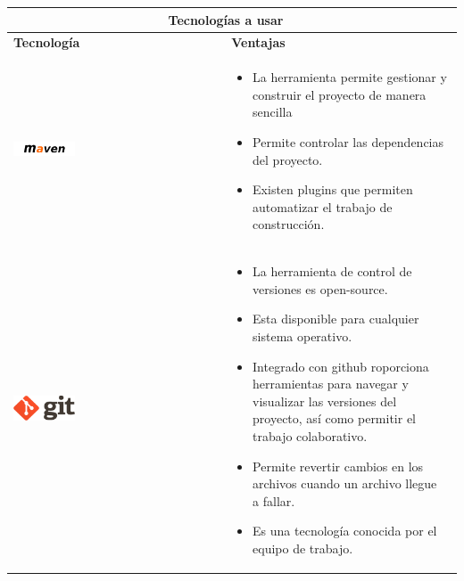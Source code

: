\newpage
\begin{table}[b!]
	\centering
	\vspace{33mm}
	\begin{tabular}{|p{2cm}|ll}
		\hline
		\multicolumn{2}{|c|}{{\bf Tecnologías a usar}} \\ 
		\hline
		\multicolumn{1}{|p{4cm}|}{{\bf Tecnología}}                                   &   
		\multicolumn{1}{p{10cm}|}{{\bf Ventajas}}\\
		\hline
		\multicolumn{1}{|p{5cm}|}{\includegraphics[width=0.3\textwidth]{images/maven}} &   
		\multicolumn{2}{p{10cm}|}{\begin{itemize}
		\vspace{-5mm}
		\item La herramienta permite gestionar y construir el proyecto de manera sencilla
		\item Permite controlar las dependencias del proyecto.
		\item Existen plugins que permiten automatizar el trabajo de construcción.
		\end{itemize}} \\
		\hline
		\multicolumn{1}{|p{5cm}|}{\includegraphics[width=0.3\textwidth]{images/git}}   &   
		\multicolumn{1}{p{10cm}|}{
		\begin{itemize}
		\vspace{-15mm}
		\item La herramienta de control de versiones es open-source.
		\item Esta disponible para cualquier sistema operativo.
		\item Integrado con github roporciona herramientas para navegar y visualizar las versiones del proyecto, así como permitir el trabajo colaborativo.
		\item Permite revertir cambios en los archivos cuando un archivo llegue a fallar.
		\item Es una tecnología conocida por el equipo de trabajo.
		\end{itemize}} \\ 
		      
		\hline
	\end{tabular}
	\label{table: tecnologias usadas}
\end{table}


